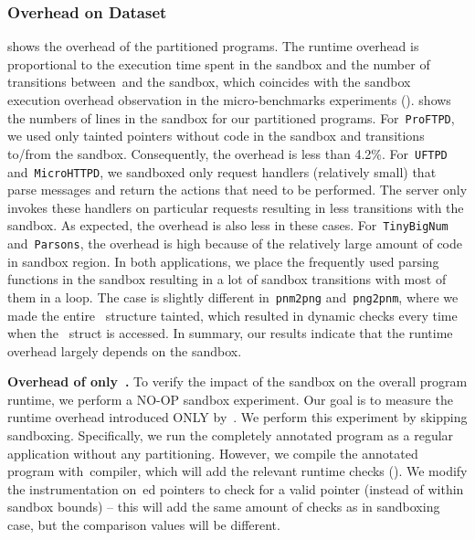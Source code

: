 \subsubsection{Overhead on Dataset}
\label{subsec:programoverhead}


%
 shows the overhead of the partitioned programs.
The runtime overhead is proportional to the execution time 
spent in the sandbox and the number of transitions between~\cregion and the sandbox,
which coincides with the sandbox execution overhead observation in the micro-benchmarks experiments ().
 shows the numbers of lines in the sandbox for our partitioned programs.
For~\texttt{ProFTPD}, we used only tainted pointers without code in the sandbox and transitions to/from the sandbox.
Consequently, the overhead is less than 4.2\%.
For~\texttt{UFTPD} and~\texttt{MicroHTTPD}, we sandboxed only request handlers (relatively small)
that parse messages and return the actions that need to be performed.
The server only invokes these handlers on particular requests resulting in less transitions with the sandbox.
As expected, the overhead is also less in these cases.
For~\texttt{TinyBigNum} and~\texttt{Parsons}, the overhead is high because of the relatively large amount of code in sandbox region.
In both applications, we place the frequently used parsing functions in the sandbox 
resulting in a lot of sandbox transitions with most of them in a loop.
The case is slightly different in~\texttt{pnm2png} and~\texttt{png2pnm},
where we made the entire~ structure tainted, 
which resulted in dynamic checks every time when the~ struct is accessed.
In summary, our results indicate that the runtime overhead largely depends on the sandbox.

\noindent\textbf{Overhead of only~\systemname{}.}
To verify the impact of the sandbox on the overall program runtime, we perform a NO-OP sandbox experiment.
Our goal is to measure the runtime overhead introduced ONLY by~\systemname{}.
We perform this experiment by skipping sandboxing.
Specifically, we run the completely annotated program as a regular application without any partitioning.
However, we compile the annotated program with~\systemname compiler, which will add the relevant runtime checks ().
We modify the instrumentation on~ed pointers to check for a valid pointer (instead of within sandbox bounds) -- this will add the same amount of checks as in sandboxing case, but the comparison values will be different.

